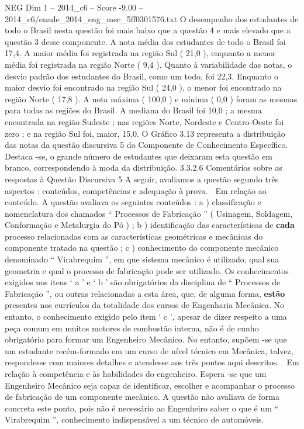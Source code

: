 \begin{textsample}{NEG Dim 1 – 2014\_c6 – Score -9.00 – 2014\_c6/enade\_2014\_eng\_mec\_5ff0301576.txt}
O desempenho dos estudantes de todo o Brasil nesta questão foi mais baixo que a questão 4 e mais elevado que a questão 3 desse componente.
A nota média dos estudantes de todo o Brasil foi 17,4.
A maior média foi registrada na região Sul ( 21,0 ), enquanto a menor média foi registrada na região Norte ( 9,4 ).
Quanto à variabilidade das notas, o desvio padrão dos estudantes do Brasil, como um todo, foi 22,3.
Enquanto o maior desvio foi encontrado na região Sul ( 24,0 ), o menor foi encontrado na região Norte ( 17,8 ).
A nota máxima ( 100,0 ) e mínima ( 0,0 ) foram as mesmas para todas as regiões do Brasil.
A mediana do Brasil foi 10,0 ; a mesma encontrada na região Sudeste ; nas regiões Norte, Nordeste e Centro-Oeste foi zero ; e na região Sul foi, maior, 15,0.
O Gráfico 3.13 representa a distribuição das notas da questão discursiva 5 do Componente de Conhecimento Específico.
Destaca -se, o grande número de estudantes que deixaram esta questão em branco, correspondendo à moda da distribuição. 3.3.2.6 Comentários sobre as respostas à Questão Discursiva 5 A seguir, avaliamos a questão segundo três aspectos : conteúdos, competências e adequação à prova.  Em relação ao conteúdo.
A questão avaliava os seguintes conteúdos : a ) classificação e nomenclatura dos chamados “ Processos de Fabricação ” ( Usinagem, Soldagem, Conformação e Metalurgia do Pó ) ; b ) identificação das características de \textbf{cada} processo relacionadas com as características geométricas e mecânicas do componente tratado na questão ; c ) conhecimento do componente mecânico denominado “ Virabrequim ”, em que sistema mecânico é utilizado, qual sua geometria e qual o processo de fabricação pode ser utilizado.
Os conhecimentos exigidos nos itens ‘ a ’ e ‘ b ’ são obrigatórios da disciplina de “ Processos de Fabricação ”, ou outras relacionadas a esta área, que, de alguma forma, \textbf{estão} presentes nos currículos da totalidade dos cursos de Engenharia Mecânica.
No entanto, o conhecimento exigido pelo item ‘ c ’, apesar de dizer respeito a uma peça comum em muitos motores de combustão interna, não é de cunho obrigatório para formar um Engenheiro Mecânico.
No entanto, supõem -se que um estudante recém-formado em um curso de nível técnico em Mecânica, talvez, respondesse com maiores detalhes e atendesse aos três pontos aqui descritos.  Em relação à competência e às habilidades do engenheiro.
Espera -se que um Engenheiro Mecânico seja capaz de identificar, escolher e acompanhar o processo de fabricação de um componente mecânico.
A questão não avaliava de forma concreta este ponto, pois não é necessário ao Engenheiro saber o que é um “ Virabrequim ”, conhecimento indispensável a um técnico de automóveis.

\end{textsample}
